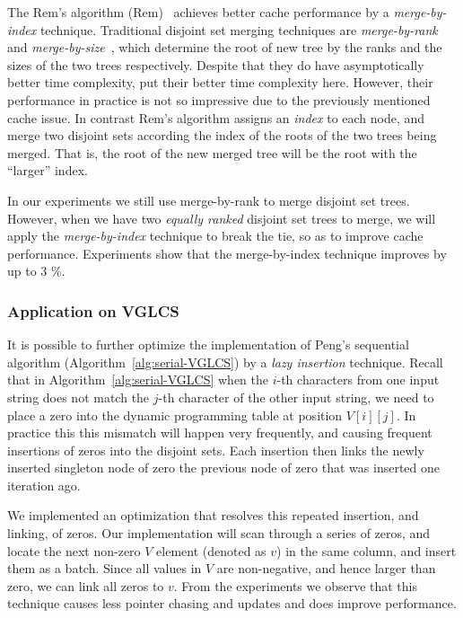 
The Rem's algorithm ({\sc Rem})~\cite{dijkstra1976a} achieves better
cache performance by a {\em merge-by-index} technique.  Traditional
disjoint set merging techniques are {\em merge-by-rank} and {\em
merge-by-size}~\cite{Tarjan1975EfficiencyOA}, which determine the root of
new tree by the ranks and the sizes of the two trees respectively.
Despite that they do have asymptotically better time complexity, put
their better time complexity here.  However, their performance in
practice is not so impressive due to the previously mentioned cache
issue.  In contrast Rem's algorithm assigns an {\em index} to each node,
and merge two disjoint sets according the index of the roots of the two
trees being merged.  That is, the root of the new merged tree will be
the root with the ``larger'' index.

In our experiments we still use merge-by-rank to merge disjoint set
trees.  However, when we have two {\em equally ranked} disjoint set
trees to merge, we will apply the {\em merge-by-index} technique to
break the tie, so as to improve cache performance.  Experiments show
that the merge-by-index technique improves by up to 3 \%.

\subsubsection{Application on VGLCS}


It is possible to further optimize the implementation of Peng's
sequential algorithm (Algorithm~\ref{alg:serial-VGLCS}) by a {\em lazy
  insertion} technique.  Recall that in
Algorithm~\ref{alg:serial-VGLCS} when the $i$-th characters from one
input string does not match the $j$-th character of the other input
string, we need to place a zero into the dynamic programming table at
position $V[i][j]$.  In practice this this mismatch will happen very
frequently, and causing frequent insertions of zeros into the disjoint
sets.  Each insertion then links the newly inserted singleton node of
zero the previous node of zero that was inserted one iteration ago. 

We implemented an optimization that resolves this repeated insertion,
and linking, of zeros.  Our implementation will scan through a series
of zeros, and locate the next non-zero $V$ element (denoted as $v$) in
the same column, and insert them as a batch.  Since all values in $V$
are non-negative, and hence larger than zero, we can link all zeros to
$v$.  From the experiments we observe that this technique causes less
pointer chasing and updates and does improve performance.

